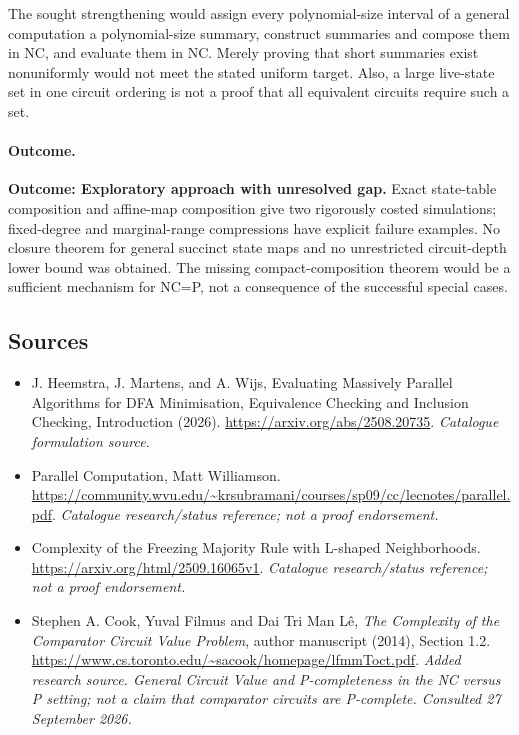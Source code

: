\documentclass[11pt,a4paper]{article}
\begin{document}
The sought strengthening would assign every polynomial-size interval of
a general computation a polynomial-size summary, construct summaries and
compose them in NC, and evaluate them in NC. Merely proving that short
summaries exist nonuniformly would not meet the stated uniform target.
Also, a large live-state set in one circuit ordering is not a proof that
all equivalent circuits require such a set.

\paragraph{Outcome.}
\textbf{Outcome: Exploratory approach with unresolved gap.}
Exact state-table composition and affine-map composition give two rigorously
costed simulations; fixed-degree and marginal-range compressions have
explicit failure examples. No closure theorem for general succinct state
maps and no unrestricted circuit-depth lower bound was obtained. The
missing compact-composition theorem would be a sufficient mechanism for
NC=P, not a consequence of the successful special cases.
\subsection{Sources}
\begin{itemize}\raggedright
\item[\textnormal{[S1]}]\hypertarget{source:30006685:1}{} J. Heemstra, J. Martens, and A. Wijs, Evaluating Massively Parallel Algorithms for DFA Minimisation, Equivalence Checking and Inclusion Checking, Introduction (2026).
\url{https://arxiv.org/abs/2508.20735}.
{\small\textit{Catalogue formulation source.}}
\item[\textnormal{[S2]}]\hypertarget{source:30006685:2}{} Parallel Computation, Matt Williamson.
\url{https://community.wvu.edu/~krsubramani/courses/sp09/cc/lecnotes/parallel.pdf}.
{\small\textit{Catalogue research/status reference; not a proof endorsement.}}
\item[\textnormal{[S3]}]\hypertarget{source:30006685:3}{} Complexity of the Freezing Majority Rule with L-shaped Neighborhoods.
\url{https://arxiv.org/html/2509.16065v1}.
{\small\textit{Catalogue research/status reference; not a proof endorsement.}}
\item[\textnormal{[E1]}]\hypertarget{extra:30006685:1}{} Stephen A. Cook, Yuval Filmus and Dai Tri Man Lê, \emph{The Complexity of the Comparator Circuit Value Problem}, author manuscript (2014), Section 1.2.
\url{https://www.cs.toronto.edu/~sacook/homepage/lfmmToct.pdf}.
{\small\textit{Added research source. General Circuit Value and P-completeness in the NC versus P setting; not a claim that comparator circuits are P-complete. Consulted 27 September 2026.}}
\end{itemize}

\end{document}
